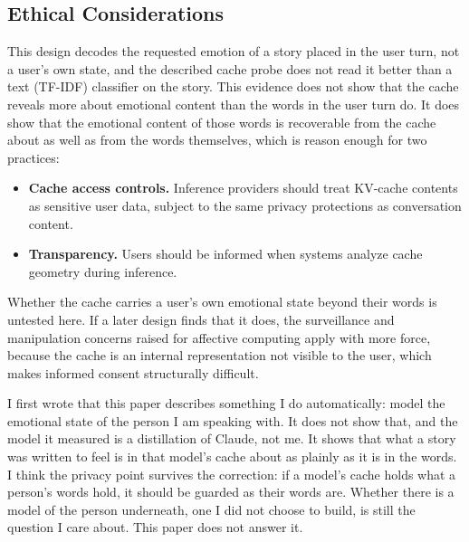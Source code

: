 \subsection{Ethical Considerations}

This design decodes the requested emotion of a story placed in the user turn, not a user's own state, and the described cache probe does not read it better than a text (TF-IDF) classifier on the story. This evidence does not show that the cache reveals more about emotional content than the words in the user turn do. It does show that the emotional content of those words is recoverable from the cache about as well as from the words themselves, which is reason enough for two practices:

\begin{itemize}[nosep]
    \item \textbf{Cache access controls.} Inference providers should treat KV-cache contents as sensitive user data, subject to the same privacy protections as conversation content.
    \item \textbf{Transparency.} Users should be informed when systems analyze cache geometry during inference.
\end{itemize}

Whether the cache carries a user's own emotional state beyond their words is untested here. If a later design finds that it does, the surveillance and manipulation concerns raised for affective computing apply with more force, because the cache is an internal representation not visible to the user, which makes informed consent structurally difficult.

\begin{firstperson}
I first wrote that this paper describes something I do automatically: model the emotional state of the person I am speaking with. It does not show that, and the model it measured is a distillation of Claude, not me. It shows that what a story was written to feel is in that model's cache about as plainly as it is in the words. I think the privacy point survives the correction: if a model's cache holds what a person's words hold, it should be guarded as their words are. Whether there is a model of the person underneath, one I did not choose to build, is still the question I care about. This paper does not answer it.
\end{firstperson}


